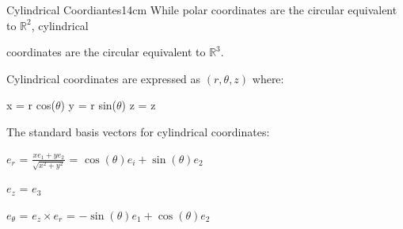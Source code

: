     \vspace{0.5cm}



    \begin{definition}{Cylindrical Coordiantes}{14cm}
        While polar coordinates are the circular equivalent to $\mathbb{R}^2$,
        cylindrical
        
        coordinates are the circular equivalent to $\mathbb{R}^3$.
        
        {\color{lblue} Cylindrical coordinates} are expressed as
        $(r,\theta,z)$ where:

        \hspace{0.5cm}
        x = r cos($\theta$)
        \hspace{1cm}
        y = r sin($\theta$)
        \hspace{1cm}
        z = z

        \vspace{0.3cm}

        The standard basis vectors for cylindrical coordinates:

        \hspace{0.5cm}
        $e_r$ = $\frac{xe_1 + ye_2}{\sqrt{x^2+y^2}}$
        = $\cos(\theta)e_i + \sin(\theta)e_2$

        \hspace{0.5cm}
        $e_z$ = $e_3$

        \hspace{0.5cm}
        $e_{\theta}$
        = $e_z \times e_r$
        = $-\sin(\theta)e_1 + \cos(\theta)e_2$
    \end{definition}

    \vspace{0.5cm}



